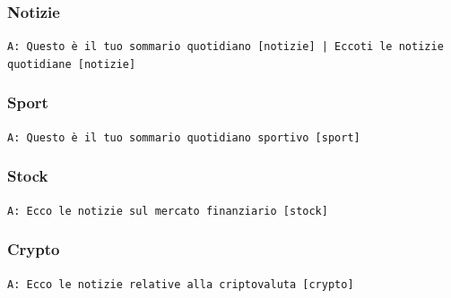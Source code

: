 \subsubsection{Notizie}
\texttt{A: Questo è il tuo sommario quotidiano [notizie] | Eccoti le notizie quotidiane [notizie]}

\subsubsection{Sport}
\texttt{A: Questo è il tuo sommario quotidiano sportivo [sport]}


\subsubsection{Stock}  
\texttt{A: Ecco le notizie sul mercato finanziario [stock]}

\subsubsection{Crypto}  
\texttt{A: Ecco le notizie relative alla criptovaluta [crypto]}

